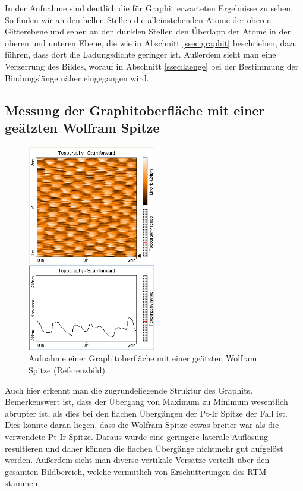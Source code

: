 \documentclass[10pt, a4paper]{article}
\begin{document}
In der Aufnahme sind deutlich die für Graphit erwarteten Ergebnisse zu sehen.
So finden wir an den hellen Stellen die alleinstehenden Atome der oberen Gitterebene und sehen an den dunklen Stellen den Überlapp der Atome in der oberen und unteren Ebene, die wie in Abschnitt \ref{ssec:graphit} beschrieben, dazu führen, dass dort die Ladungsdichte geringer ist.
Außerdem sieht man eine Verzerrung des Bildes, worauf in Abschnitt \ref{ssec:laenge} bei der Bestimmung der Bindungslänge näher eingegangen wird.

\subsection{Messung der Graphitoberfläche mit einer geätzten Wolfram Spitze}
\begin{figure}[!h]
\centering
\includegraphics[width=0.5\textwidth]{./grafiken/originale/ref_graphit_w_2nm.png}
\caption{Aufnahme einer Graphitoberfläche mit einer geätzten Wolfram Spitze (Referenzbild)}
\label{fig:ref_w}
\end{figure}

Auch hier erkennt man die zugrundeliegende Struktur des Graphits.
Bemerkenswert ist, dass der Übergang von Maximum zu Minimum wesentlich abrupter ist, als dies bei den flachen Übergängen der Pt-Ir Spitze der Fall ist.
Dies könnte daran liegen, dass die Wolfram Spitze etwas breiter war als die verwendete Pt-Ir Spitze.
Daraus würde eine geringere laterale Auflösung resultieren und daher können die flachen Übergänge nichtmehr gut aufgelöst werden.
Außerdem sieht man diverse vertikale Versätze verteilt über den gesamten Bildbereich, welche vermutlich von Erschütterungen des RTM stammen.
\end{document}
